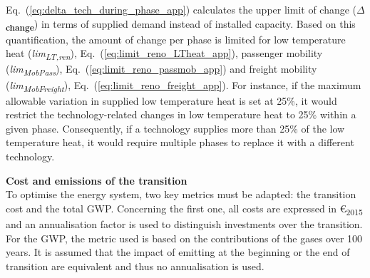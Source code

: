 Eq.~(\ref{eq:delta_tech_during_phase_app}) calculates the upper limit of change (\textbf{$\Delta$\textsubscript{change}}) in terms of supplied demand instead of installed capacity. 
Based on this quantification, the amount of change per phase is limited for low temperature heat (\emph{lim\textsubscript{LT,ren}}), Eq.~(\ref{eq:limit_reno_LTheat_app}), passenger mobility (\emph{lim\textsubscript{MobPass}}), Eq.~(\ref{eq:limit_reno_passmob_app}) and freight mobility (\emph{lim\textsubscript{MobFreight}}), Eq.~(\ref{eq:limit_reno_freight_app}). 
For instance, if the maximum allowable variation in supplied low temperature heat is set at 25\%, it would restrict the technology-related changes in low temperature heat to 25\% within a given phase. Consequently, if a technology supplies more than 25\% of the low temperature heat, it would require multiple phases to replace it with a different technology.

\vspace{0.2cm}\textbf{Cost and emissions of the transition}\vspace{-0.3cm}\\

To optimise the energy system, two key metrics must be adapted: the transition cost and the total \acrfull{GWP}. 
Concerning the first one, all costs are expressed in €\textsubscript{2015} and an annualisation factor is used to distinguish investments over the transition. For the \gls{GWP}, the metric used is based on the contributions of the gases over 100 years. It is assumed that the impact of emitting at the beginning or the end of transition are equivalent and thus no annualisation is used. 


